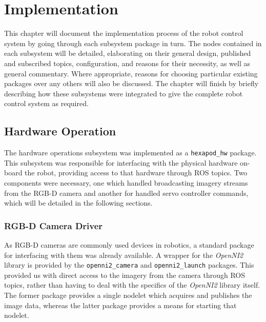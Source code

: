 \chapter{Implementation}
\label{chap:implementation}


This chapter will document the implementation process of the robot control system by going through each subsystem package in turn. The nodes contained in each subsystem will be detailed, elaborating on their general design, published and subscribed topics, configuration, and reasons for their necessity, as well as general commentary. Where appropriate, reasons for choosing particular existing packages over any others will also be discussed. The chapter will finish by briefly describing how these subsystems were integrated to give the complete robot control system as required.


\section{Hardware Operation}

The hardware operations subsystem was implemented as a \texttt{hexapod\_hw} package. This subsystem was responsible for interfacing with the physical hardware on-board the robot, providing access to that hardware through ROS topics. Two components were necessary, one which handled broadcasting imagery streams from the RGB-D camera and another for handled servo controller commands, which will be detailed in the following sections.

\subsection{RGB-D Camera Driver}

As RGB-D cameras are commonly used devices in robotics, a standard package for interfacing with them was already available. A wrapper for the \emph{OpenNI2} library is provided by the \texttt{openni2\_camera} \cite{ros_wiki_openni2_camera} and \texttt{openni2\_launch} \cite{ros_wiki_openni2_launch} packages. This provided us with direct access to the imagery from the camera through ROS topics, rather than having to deal with the specifics of the \emph{OpenNI2} library itself. The former package provides a single nodelet which acquires and publishes the image data, whereas the latter package provides a means for starting that nodelet.


